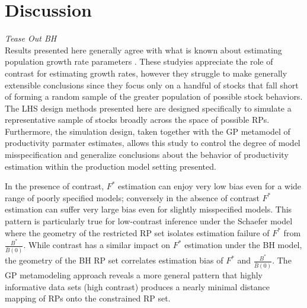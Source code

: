 %
\section{Discussion}


{\color{blue} {\it Tease Out BH}\\

%
Results presented here generally agree with what is known about estimating population
growth rate parameters \cite{lee_can_2012, conn_when_2010, magnusson_what_2007}.
These studyies appreciate the role of contrast for estimating growth rates,
however they struggle to make generally extensible conclusions since they focus only
on a handful of stocks that fall short of forming a random sample of the greater
population of possible stock behaviors. The LHS design methods presented here are
designed specifically to simulate a representative sample of stocks broadly
across the space of possible RPs. Furthermore, the simulation design, taken together
with the GP metamodel of productivity parmater estimates, allows this study to control
the degree of model misspecification and generalize conclusions about the behavior
of productivity estimation within the production model setting presented.


%
In the presence of contrast, $F^*$ estimation can enjoy very low bias even
for a wide range of poorly specified models; conversely in the absence of contrast
$F^*$ estimation can suffer very large bias even for slightly misspecified models.
This pattern is particularly true for low-contrast inference under the Schaefer model where the
geometry of the restricted RP set isolates estimation failure of $F^*$ from
$\frac{B^*}{\bar B(0)}$. While contrast has a similar impact on $F^*$ estimation
under the BH model, the geometry of the BH RP set correlates estimation bias
of $F^*$ and $\frac{B^*}{\bar B(0)}$. The GP metamodeling approach reveals a
more general pattern that highly informative data sets (high contrast)
produces a nearly minimal distance mapping of RPs %
onto the constrained RP set.

}

